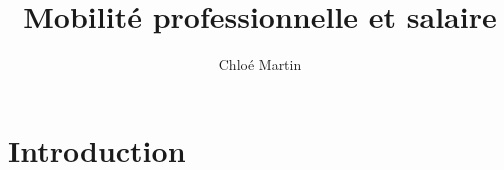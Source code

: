 \documentclass[12pt,a4paper]{article}
\title{Mobilité professionnelle et salaire}
\author{Chloé Martin}
\begin{document}
\maketitle

\section*{Introduction}
\end{document}
